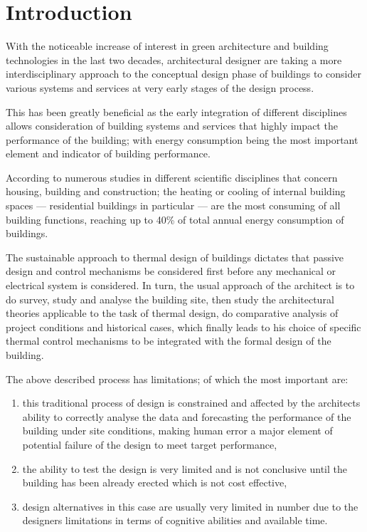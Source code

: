 \cleardoublepage
\tableofcontents

\cleardoublepage
\listoffigures

\cleardoublepage
\listoftables

\cleardoublepage

\chapter{Introduction}

With the noticeable increase of interest in green architecture and building technologies in the last two decades, architectural designer are taking a more interdisciplinary approach to the conceptual design phase of buildings to consider various systems and services at very early stages of the design process.

This has been greatly beneficial as the early integration of different disciplines allows consideration of building systems and services that highly impact the performance of the building; with energy consumption being the most important element and indicator of building performance.

According to numerous studies in different scientific disciplines that concern housing, building and construction; the heating or cooling of internal building spaces --- residential buildings in particular --- are the most consuming of all building functions, reaching up to 40\% of total annual energy consumption of buildings.

The sustainable approach to thermal design of buildings dictates that passive design and control mechanisms be considered first before any mechanical or electrical system is considered. In turn, the usual approach of the architect is to do survey, study and analyse the building site, then study the architectural theories applicable to the task of thermal design, do comparative analysis of project conditions and historical cases, which finally leads to his choice of specific thermal control mechanisms to be integrated with the formal design of the building.

The above described process has limitations; of which the most important are:
\begin{enumerate}
	\item this traditional process of design is constrained and affected by the architects ability to correctly analyse the data and forecasting the performance of the building under site conditions, making human error a major element of potential failure of the design to meet target performance, 
	\item the ability to test the design is very limited and is not conclusive until the building has been already erected which is not cost effective, 
	\item design alternatives in this case are usually very limited in number due to the designers limitations in terms of cognitive abilities and available time.
\end{enumerate}

